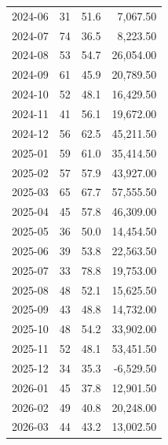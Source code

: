 \documentclass[11pt,a4paper,twoside]{article}
\begin{document}
\begin{center}
\begin{tabular}{>{\color{txtmain}}l rrr}
2024-06 & 31 & 51.6 & \textcolor{wingreen}{7,067.50} \\
2024-07 & 74 & 36.5 & \textcolor{wingreen}{8,223.50} \\
2024-08 & 53 & 54.7 & \textcolor{wingreen}{26,054.00} \\
2024-09 & 61 & 45.9 & \textcolor{wingreen}{20,789.50} \\
2024-10 & 52 & 48.1 & \textcolor{wingreen}{16,429.50} \\
2024-11 & 41 & 56.1 & \textcolor{wingreen}{19,672.00} \\
2024-12 & 56 & 62.5 & \textcolor{wingreen}{45,211.50} \\
2025-01 & 59 & 61.0 & \textcolor{wingreen}{35,414.50} \\
2025-02 & 57 & 57.9 & \textcolor{wingreen}{43,927.00} \\
2025-03 & 65 & 67.7 & \textcolor{wingreen}{57,555.50} \\
2025-04 & 45 & 57.8 & \textcolor{wingreen}{46,309.00} \\
2025-05 & 36 & 50.0 & \textcolor{wingreen}{14,454.50} \\
2025-06 & 39 & 53.8 & \textcolor{wingreen}{22,563.50} \\
2025-07 & 33 & 78.8 & \textcolor{wingreen}{19,753.00} \\
2025-08 & 48 & 52.1 & \textcolor{wingreen}{15,625.50} \\
2025-09 & 43 & 48.8 & \textcolor{wingreen}{14,732.00} \\
2025-10 & 48 & 54.2 & \textcolor{wingreen}{33,902.00} \\
2025-11 & 52 & 48.1 & \textcolor{wingreen}{53,451.50} \\
2025-12 & 34 & 35.3 & \textcolor{lossred}{-6,529.50} \\
2026-01 & 45 & 37.8 & \textcolor{wingreen}{12,901.50} \\
2026-02 & 49 & 40.8 & \textcolor{wingreen}{20,248.00} \\
2026-03 & 44 & 43.2 & \textcolor{wingreen}{13,002.50} \\
\bottomrule
\end{tabular}
\end{center}
\end{document}
